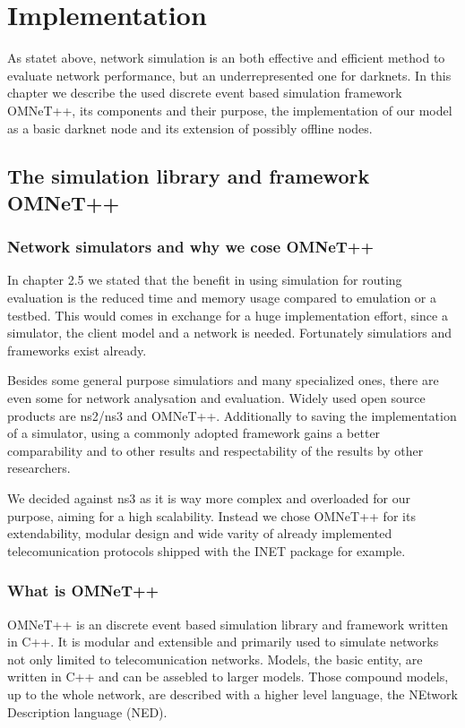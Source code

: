 \chapter{Implementation}

As statet above, network simulation is an both effective and efficient method to evaluate network performance, but an underrepresented one for darknets. In this chapter we describe the used discrete event based simulation framework OMNeT++, its components and their purpose, the implementation of our model as a basic darknet node and its extension of possibly offline nodes.

\section{The simulation library and framework OMNeT++}

\subsection{Network simulators and why we cose OMNeT++}

In chapter 2.5 we stated that the benefit in using simulation for routing evaluation is the reduced time and memory usage compared to emulation or a testbed. This would comes in exchange for a huge implementation effort, since a simulator, the client model and a network is needed. Fortunately simulatiors and frameworks exist already.

Besides some general purpose simulatiors and many specialized ones, there are even some for network analysation and evaluation. Widely used open source products are ns2/ns3 and OMNeT++. Additionally to saving the implementation of a simulator, using a commonly adopted framework gains a better comparability and to other results and respectability of the results by other researchers.

We decided against ns3 as it is way more complex and overloaded for our purpose, aiming for a high scalability. Instead we chose OMNeT++ for its extendability, modular design and wide varity of already implemented telecomunication protocols shipped with the INET package for example.

\subsection{What is OMNeT++}

OMNeT++ is an discrete event based simulation library and framework written in C++. It is modular and extensible and primarily used to simulate networks not only limited to telecomunication networks. Models, the basic entity, are written in C++ and can be assebled to larger models. Those compound models, up to the whole network, are described with a higher level language, the NEtwork Description language (NED). 

